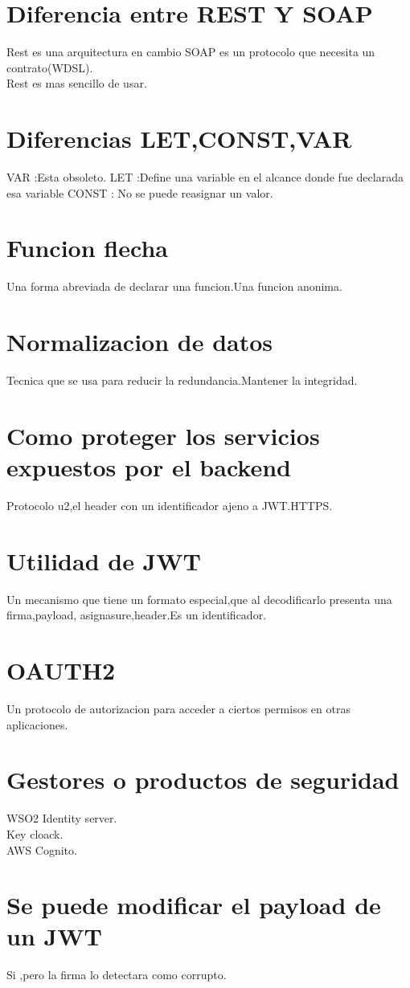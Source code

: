 \section{Diferencia entre REST Y SOAP}
Rest es una arquitectura en cambio SOAP es un protocolo que necesita un contrato(WDSL).\\
Rest es mas sencillo de usar.
\section{Diferencias LET,CONST,VAR}
VAR :Esta obsoleto.
LET :Define una variable en el  alcance donde fue declarada esa variable
CONST : No se puede reasignar un valor.
\section{Funcion flecha}
Una forma abreviada de declarar una funcion.Una funcion anonima.
\section{Normalizacion de datos}
Tecnica que se usa para reducir la redundancia.Mantener la integridad.
\section{Como proteger los servicios expuestos por el backend}
Protocolo u2,el header con un identificador ajeno a JWT.HTTPS.
\section{Utilidad de JWT}
Un mecanismo que tiene un formato especial,que al decodificarlo presenta una firma,payload,
asignasure,header.Es un identificador.
\section{OAUTH2}
Un protocolo de autorizacion para acceder a ciertos permisos en otras aplicaciones.
\section{Gestores o productos de seguridad}
WSO2 Identity server.\\
Key cloack.\\
AWS Cognito.
\section{Se puede modificar el payload de un JWT}
Si ,pero la firma lo detectara como corrupto.
